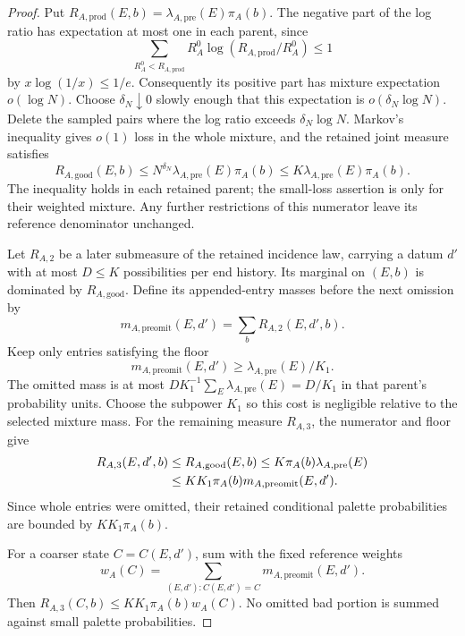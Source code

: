 \begin{proof}
Put
\(R_{A,\mathrm{prod}}(E,b)=\lambda_{A,\mathrm{pre}}(E)\pi_A(b)\).
The negative part of the log ratio has expectation at most one
in each parent, since
\[
 \sum_{R_A^0<R_{A,\mathrm{prod}}}
 R_A^0\log(R_{A,\mathrm{prod}}/R_A^0)\le1
\]
by \(x\log(1/x)\le1/e\).  Consequently its positive part has
mixture expectation \(o(\log N)\).  Choose
\(\delta_N\downarrow0\) slowly enough that this expectation is
\(o(\delta_N\log N)\).  Delete the sampled pairs where the log
ratio exceeds \(\delta_N\log N\).  Markov's inequality gives
\(o(1)\) loss in the whole mixture, and the retained joint measure
satisfies
\begin{equation}
 R_{A,\mathrm{good}}(E,b)
 \le N^{\delta_N}\lambda_{A,\mathrm{pre}}(E)\pi_A(b)
 \le K\lambda_{A,\mathrm{pre}}(E)\pi_A(b).
 \label{a03:good-joint-numerator}
\end{equation}
The inequality holds in each retained parent; the small-loss
assertion is only for their weighted mixture.  Any further restrictions
of this numerator leave its reference denominator unchanged.

Let \(R_{A,2}\) be a later submeasure of the retained incidence
law, carrying a datum \(d'\) with at most \(D\le K\) possibilities
per end history.  Its marginal on \((E,b)\) is dominated by
\(R_{A,\mathrm{good}}\).  Define its appended-entry masses before
the next omission by
\[
 m_{A,\mathrm{preomit}}(E,d')
    =\sum_bR_{A,2}(E,d',b).
\]
Keep only entries satisfying the floor
\begin{equation}
 m_{A,\mathrm{preomit}}(E,d')
       \ge \lambda_{A,\mathrm{pre}}(E)/K_1.
 \label{a03:appended-entry-floor}
\end{equation}
The omitted mass is at most
\(D K_1^{-1}\sum_E\lambda_{A,\mathrm{pre}}(E)=D/K_1\)
in that parent's probability units.  Choose the subpower \(K_1\)
so this cost is negligible relative to the selected mixture mass.
For the remaining measure \(R_{A,3}\), the numerator and floor give
\begin{align}
 R_{A,3}(E,d',b)
 &\le R_{A,\mathrm{good}}(E,b)
 \le K\pi_A(b)\lambda_{A,\mathrm{pre}}(E)\notag\\
 &\le KK_1\pi_A(b)m_{A,\mathrm{preomit}}(E,d').
 \label{a03:appended-joint-cap}
\end{align}
Since whole entries were omitted, their retained conditional
palette probabilities are bounded by \(KK_1\pi_A(b)\).

For a coarser state \(C=C(E,d')\), sum
 with the fixed reference weights
\[
 w_A(C)=\sum_{(E,d'):C(E,d')=C}
             m_{A,\mathrm{preomit}}(E,d').
\]
Then \(R_{A,3}(C,b)\le KK_1\pi_A(b)w_A(C)\).
No omitted bad portion is summed against small palette probabilities.


\end{proof}
